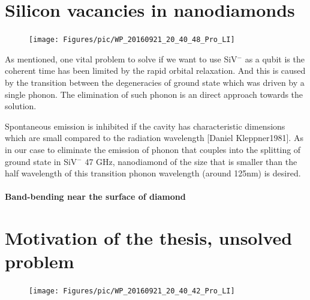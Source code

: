 
\section[Silicon vacancies in nanodiamonds]{Silicon vacancies in nanodiamonds}
\FloatBarrier
\begin{figure}[h]
\centering
\texttt{[image: Figures/pic/WP\_20160921\_20\_40\_48\_Pro\_LI]}
\caption{}
\label{fig:wp20160921204048proli}
\end{figure}
\FloatBarrier
As mentioned, one vital problem to solve if we want to use SiV$^{-}$ as a qubit is the coherent time has been limited by the rapid orbital relaxation. And this is caused by the transition between the degeneracies of ground state which was driven by a single phonon. The elimination of such phonon is an direct approach towards the solution.

Spontaneous emission is inhibited if the cavity has characteristic dimensions which are small compared to the radiation wavelength [Daniel Kleppner1981]. As in our case to eliminate the emission of phonon that couples into the splitting of ground state in SiV$^{-}$ 47 GHz, nanodiamond of the size that is smaller than the half wavelength of this transition phonon wavelength (around 125nm) is desired. 


 
\paragraph{Band-bending near the surface of diamond}  



\section[Motivation of the thesis, unsolved problem]{Motivation of the thesis, unsolved problem}
\FloatBarrier
\begin{figure}[h]
	\centering
	\texttt{[image: Figures/pic/WP\_20160921\_20\_40\_42\_Pro\_LI]}
	\caption{}
	\label{fig:wp20160921204042proli}
\end{figure}
\FloatBarrier
